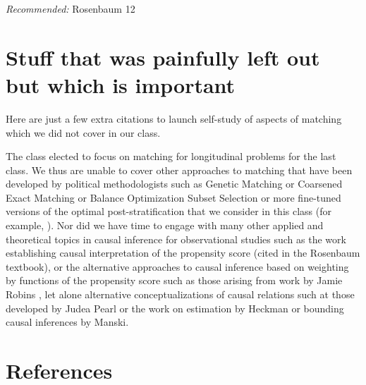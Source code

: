 \documentclass[10pt]{article}
\begin{document}
\emph{Recommended:} Rosenbaum 12


\section{Stuff that was painfully left out but which is important}

Here are just a few extra citations to launch self-study of aspects of
matching which we did not cover in our class.

The class elected to focus on matching for longitudinal problems for
the last class. We thus are unable to cover other approaches to
matching that have been developed by political methodologists such as
Genetic Matching \citep{diamond2006genetic, sekhon2007multivariate} or
Coarsened Exact Matching \citep{iacus2009causal,
  iacus2011multivariate} or Balance Optimization Subset Selection
\citep{Nikolaevetal:12} or more fine-tuned versions of the optimal
post-stratification that we consider in this class (for example,
\citep{zubizarreta2012using}). Nor did we have time to engage with
many other applied and theoretical topics in causal inference for
observational studies such as the work establishing causal
interpretation of the propensity score (cited in the Rosenbaum
textbook), or the alternative approaches to causal inference based on
weighting by functions of the propensity score such as those arising
from work by Jamie Robins \citep{glynn2010introduction}, let alone
alternative conceptualizations of causal relations such at those
developed by Judea Pearl \citep{JudeaPearl2000a} or the work on
estimation by Heckman or bounding causal inferences by Manski.


\section{References}


\end{document}
